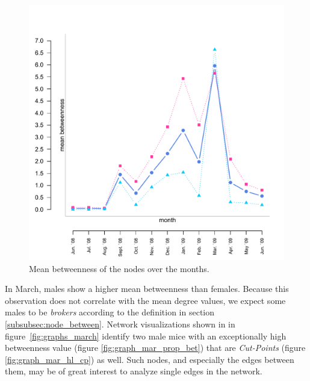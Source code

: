 \begin{figure}[htpb]
\begin{center}
  \includegraphics[width=.6\textwidth]{assets/pdf/long_betweenness.pdf}
  \caption[Mean betweenness of the nodes over the months]{Mean betweenness of the nodes over the months.}
  \label{fig:long_betweenness}
\end{center}
\end{figure}

In March, males show a higher mean betweenness than females. Because this observation does not correlate with the mean degree values, we expect some males to be \textit{brokers} according to the definition in section \ref{subsubsec:node_between}. Network visualizations shown in in figure~\ref{fig:graphs_march} identify two male mice with an exceptionally high betweenness value (figure \ref{fig:graph_mar_prop_bet}) that are  \textit{Cut-Points} (figure \ref{fig:graph_mar_hl_cp}) as well. Such nodes, and especially the edges between them, may be of great interest to analyze single edges in the network.   

